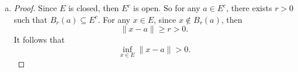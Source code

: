 \begin{Exercise}
\begin{enumerate}[a)]
\item
\begin{proof}
Since $E$ is closed, then $E^c$ is open. So for any $a\in E^c$, there exists $r>0$ such that $B_r(a)\subseteq E^c$. For any $x\in E$, since $x\notin B_r(a)$, then $$ \| x-a \| \geq r > 0.$$
It follows that $$ \inf_{x\in E} \| x-a \| > 0.$$
\end{proof}
\end{enumerate}
\end{Exercise}
